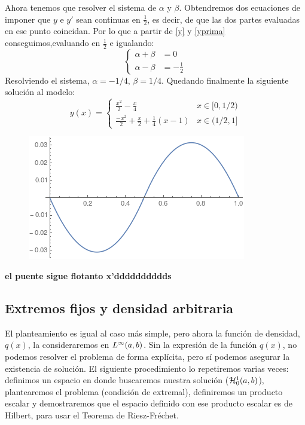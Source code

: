 Ahora tenemos que resolver el sistema de $\alpha$ y $\beta$. Obtendremos dos ecuaciones de imponer que $y$ e $y'$ sean continuas en $\frac{1}{2}$, es decir, de que las dos partes evaluadas en ese punto coincidan. Por lo que a partir de \eqref{y} y \eqref{yprima} conseguimos,evaluando en $\frac{1}{2}$ e igualando:
\begin{equation}
\left\{
\begin{array}{cc}
\alpha+\beta & =0 \\
\alpha-\beta & =-\frac{1}{2}
\end{array}
\right.
\end{equation}
Resolviendo el sistema, $\alpha=-1/4$, $\beta=1/4$. Quedando finalmente la siguiente solución al modelo:
\begin{equation}\label{y}
y(x)=\left\{
\begin{array}{cc}
\frac{x^2}{2}-\frac{x}{4} & x\in[0,1/2) \\
\frac{-x^2}{2}+\frac{x}{2}+\frac{1}{4}(x-1) & x\in(1/2,1]
\end{array}
\right.
\end{equation}

\begin{figure}[h]
   \center
  \includegraphics[scale=0.6]{img/puenteflotante.png}
\end{figure}

\textbf{el puente sigue flotanto x'dddddddddds}

\subsection{Extremos fijos y densidad arbitraria}

El planteamiento es igual al caso más simple, pero ahora la función de densidad, $q(x)$, la consideraremos en $L^{ \infty }(a,b)$. Sin la expresión de la función $q(x)$, no podemos resolver el problema de forma explícita, pero sí podemos asegurar la existencia de solución. El siguiente procedimiento lo repetiremos varias veces: definimos un espacio en donde buscaremos nuestra solución ($\mathcal{H}_0^{ 1 } (a,b)$), plantearemos el problema (condición de extremal), definiremos un producto escalar y demostraremos que el espacio definido con ese producto escalar es de Hilbert, para usar el Teorema de Riesz-Fréchet.

